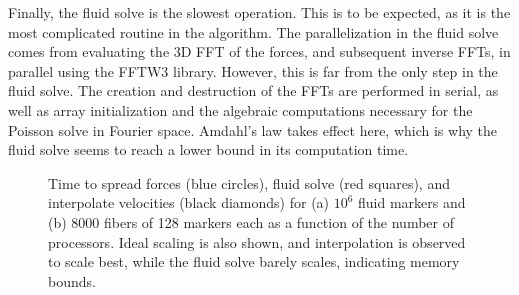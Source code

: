 \documentclass[]{article}
\begin{document}
Finally, the fluid solve is the slowest operation. This is to be expected, as it is the most complicated routine in the algorithm. The parallelization in the fluid solve comes from evaluating the 3D FFT of the forces, and subsequent inverse FFTs, in parallel using the FFTW3 library. However, this is far from the only step in the fluid solve. The creation and destruction of the FFTs are performed in serial, as well as array initialization and the algebraic computations necessary for the Poisson solve in Fourier space. Amdahl's law takes effect here, which is why the fluid solve seems to reach a lower bound in its computation time. 


\begin{figure}
\centering     
{}
\caption{Time to spread forces (blue circles), fluid solve (red squares), and interpolate velocities (black diamonds) for (a) $10^6$ fluid markers and (b) 8000 fibers of 128 markers each as a function of the number of processors. Ideal scaling is also shown, and interpolation is observed to scale best, while the fluid solve barely scales, indicating memory bounds. }
\label{fig:Strong}
\end{figure}
\end{document}
